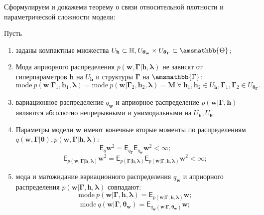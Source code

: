 Сформулируем и докажеми теорему о связи относительной плотности и параметрической сложности модели:

\begin{theorem}
Пусть
\begin{enumerate}
\item заданы компактные множества $U_\mathbf{h} \subset \mathbb{H}, U_{\boldsymbol{\theta}_\mathbf{w}} \times U_{\boldsymbol{\theta}_{\boldsymbol{\Gamma}}} \subset \amsmathbb{\Theta}$;


\item Мода априорного распределения $p(\mathbf{w},\boldsymbol{\Gamma}| \mathbf{h}, \boldsymbol{\lambda})$ не зависят от гиперпараметров $\mathbf{h}$  на $U_\mathbf{h}$ и структуры $\boldsymbol{\Gamma}$ на $\amsmathbb{\Gamma}$:
\[\text{mode}~p(\mathbf{w}|\boldsymbol{\Gamma}_1, \mathbf{h}_1, \boldsymbol{\lambda})=\text{mode}~ p(\mathbf{w}|\boldsymbol{\Gamma}_2,\mathbf{h}_2, \boldsymbol{\lambda})=\mathbf{M}~\forall~\mathbf{h}_1, \mathbf{h}_2\in U_\mathbf{h},\boldsymbol{\Gamma}_1, \boldsymbol{\Gamma}_2\in U_{\boldsymbol{\theta}_{\boldsymbol{\Gamma}}}.
\]

\item вариационное распределение $q_\mathbf{w}$ и априорное распределение $p(\mathbf{w}|\boldsymbol{\Gamma}, \mathbf{h})$  являются абсолютно непрерывными и унимодальными на  $U_\mathbf{h}, U_{\boldsymbol{\theta}}$.

\item Параметры модели $\mathbf{w}$ имеют конечные вторые моменты по распределениям $q(\mathbf{w}, \boldsymbol{\Gamma}|\boldsymbol{\theta}), p(\mathbf{w}, \boldsymbol{\Gamma}|\mathbf{h}, \boldsymbol{\lambda})$:
\[
    \mathsf{E}_q \mathbf{w}^2 = \mathsf{E}_{q_{\boldsymbol{\Gamma}}}\mathsf{E}_{q_\mathbf{w}}\mathbf{w}^2 < \infty;
\]
\[
    \mathsf{E}_{p(\mathbf{w},\boldsymbol{\Gamma}|\mathbf{h}, \boldsymbol{\lambda})}\mathbf{w}^2 = \mathsf{E}_{p(\boldsymbol{\Gamma}|\mathbf{h}, \boldsymbol{\lambda})} \mathsf{E}_{p(\mathbf{w}|\boldsymbol{\Gamma}, \mathbf{h}, \boldsymbol{\lambda})}\mathbf{w}^2 < \infty;
\]

\item мода и матожидание вариационного распределения $q_\mathbf{w}$ и априорного распределения $p(\mathbf{w}|\boldsymbol{\Gamma},\mathbf{h}, \boldsymbol{\lambda})$  совпадают:
\[
    \text{mode}~p(\mathbf{w}|\boldsymbol{\Gamma},\mathbf{h}, \boldsymbol{\lambda}) = \mathsf{E}_{p(\mathbf{w}| \boldsymbol{\Gamma}, \mathbf{h}, \boldsymbol{\lambda})} \mathbf{w};
\]
\[
  \text{mode}~q(\mathbf{w}|\boldsymbol{\Gamma}, \boldsymbol{\theta}_\mathbf{w}) = \mathsf{E}_{q_\mathbf{w}(\mathbf{w}|\boldsymbol{\Gamma},  \boldsymbol{\theta}_\mathbf{w})} \mathbf{w};
\]


\end{enumerate}
\end{theorem}
